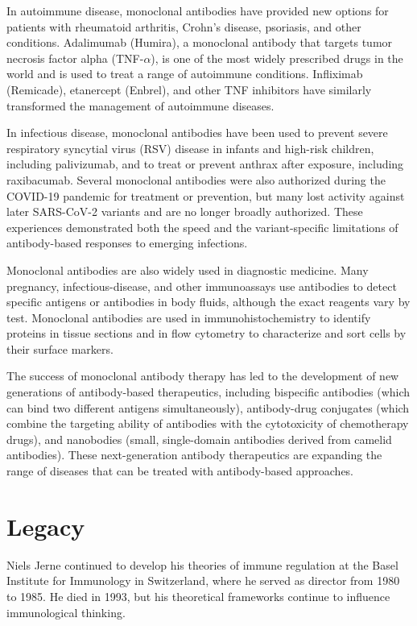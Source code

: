 In autoimmune disease, monoclonal antibodies have provided new options for patients with rheumatoid arthritis, Crohn's disease, psoriasis, and other conditions. Adalimumab (Humira), a monoclonal antibody that targets tumor necrosis factor alpha (TNF-$\alpha$), is one of the most widely prescribed drugs in the world and is used to treat a range of autoimmune conditions. Infliximab (Remicade), etanercept (Enbrel), and other TNF inhibitors have similarly transformed the management of autoimmune diseases.

In infectious disease, monoclonal antibodies have been used to prevent severe respiratory syncytial virus (RSV) disease in infants and high-risk children, including palivizumab, and to treat or prevent anthrax after exposure, including raxibacumab. Several monoclonal antibodies were also authorized during the COVID-19 pandemic for treatment or prevention, but many lost activity against later SARS-CoV-2 variants and are no longer broadly authorized. These experiences demonstrated both the speed and the variant-specific limitations of antibody-based responses to emerging infections.

Monoclonal antibodies are also widely used in diagnostic medicine. Many pregnancy, infectious-disease, and other immunoassays use antibodies to detect specific antigens or antibodies in body fluids, although the exact reagents vary by test. Monoclonal antibodies are used in immunohistochemistry to identify proteins in tissue sections and in flow cytometry to characterize and sort cells by their surface markers.

The success of monoclonal antibody therapy has led to the development of new generations of antibody-based therapeutics, including bispecific antibodies (which can bind two different antigens simultaneously), antibody-drug conjugates (which combine the targeting ability of antibodies with the cytotoxicity of chemotherapy drugs), and nanobodies (small, single-domain antibodies derived from camelid antibodies). These next-generation antibody therapeutics are expanding the range of diseases that can be treated with antibody-based approaches.

\section{Legacy}

Niels Jerne continued to develop his theories of immune regulation at the Basel Institute for Immunology in Switzerland, where he served as director from 1980 to 1985. He died in 1993, but his theoretical frameworks continue to influence immunological thinking.

